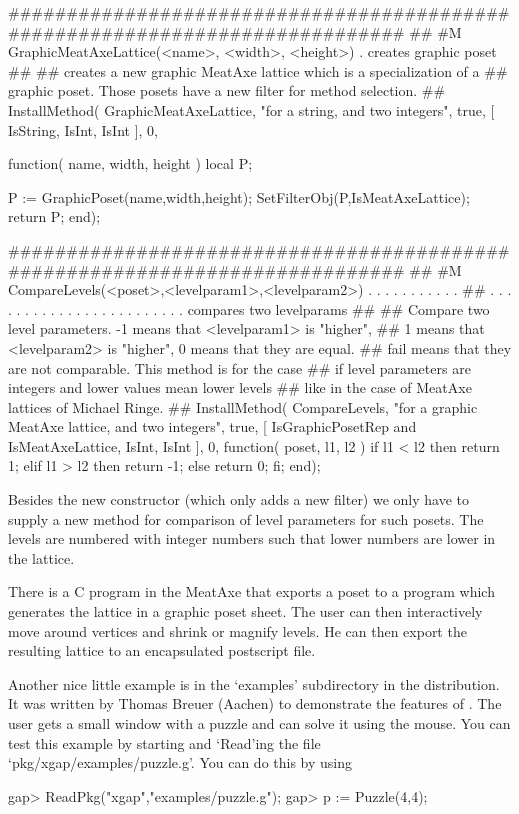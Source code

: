 #############################################################################
##
#M  GraphicMeatAxeLattice(<name>, <width>, <height>)  . creates graphic poset
##
##  creates a new graphic MeatAxe lattice which is a specialization of a
##  graphic poset. Those posets have a new filter for method selection.
##
InstallMethod( GraphicMeatAxeLattice,
    "for a string, and two integers",
    true,
    [ IsString,
      IsInt,
      IsInt ],
    0,

function( name, width, height )
  local P;

  P := GraphicPoset(name,width,height);
  SetFilterObj(P,IsMeatAxeLattice);
  return P;
end);

#############################################################################
##
#M  CompareLevels(<poset>,<levelparam1>,<levelparam2>)  . . . . . . . . . . .
##  . . . . . . . . . . . . . . . . . . . . . . . .  compares two levelparams
##
##  Compare two level parameters. -1 means that <levelparam1> is "higher", 
##  1 means that <levelparam2> is "higher", 0 means that they are equal. 
##  fail means that they are not comparable. This method is for the case 
##  if level parameters are integers and lower values mean lower levels 
##  like in the case of MeatAxe lattices of Michael Ringe.
##
InstallMethod( CompareLevels,
    "for a graphic MeatAxe lattice, and two integers",
    true,
    [ IsGraphicPosetRep and IsMeatAxeLattice, IsInt, IsInt ],
    0,
function( poset, l1, l2 )
  if l1 < l2 then
    return 1;
  elif l1 > l2 then
    return -1;
  else
    return 0;
  fi;
end);
\endexample

Besides the new constructor (which only adds a new filter) we only have to
supply a new method for comparison of level parameters for such posets. The 
levels are numbered with integer numbers such that lower numbers are lower
in the lattice.

There is a C program in the MeatAxe that exports a poset to a {\GAP}
program which generates the lattice in a graphic poset sheet. The user can
then interactively move around vertices and shrink or magnify levels. He
can then export the resulting lattice to an encapsulated postscript file.

Another nice little example is in the `examples' subdirectory in the
{\XGAP} distribution. It was written by Thomas Breuer (Aachen) to
demonstrate the features of {\XGAP}. The user gets a small window with a
puzzle and can solve it using the mouse. You can test this example by
starting {\XGAP} and `Read'ing the file `pkg/xgap/examples/puzzle.g'.
You can do this by using

\begintt
gap> ReadPkg("xgap","examples/puzzle.g");
gap> p := Puzzle(4,4);
\endtt



